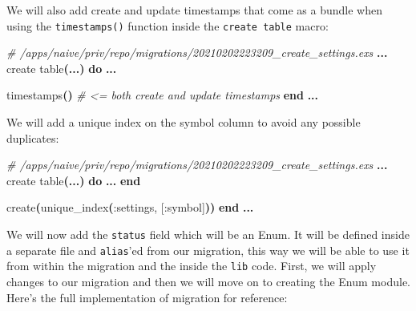 \documentclass[
  oneside]{book}
\newenvironment{Shaded}{\begin{snugshade}}{\end{snugshade}}
\newcommand{\CommentTok}[1]{\textcolor[rgb]{0.56,0.35,0.01}{\textit{#1}}}
\newcommand{\FunctionTok}[1]{\textcolor[rgb]{0.13,0.29,0.53}{\textbf{#1}}}
\newcommand{\KeywordTok}[1]{\textcolor[rgb]{0.13,0.29,0.53}{\textbf{#1}}}
\newcommand{\NormalTok}[1]{#1}
\newcommand{\OperatorTok}[1]{\textcolor[rgb]{0.81,0.36,0.00}{\textbf{#1}}}
\newcommand{\OtherTok}[1]{\textcolor[rgb]{0.56,0.35,0.01}{#1}}
\newcommand{\VariableTok}[1]{\textcolor[rgb]{0.00,0.00,0.00}{#1}}
\begin{document}
\newpage

We will also add create and update timestamps that come as a bundle when using the \texttt{timestamps()} function inside the \texttt{create\ table} macro:

\begin{Shaded}
\begin{Highlighting}[]
\CommentTok{\# /apps/naive/priv/repo/migrations/20210202223209\_create\_settings.exs}
\OperatorTok{...}
\NormalTok{    create table}\FunctionTok{(}\OperatorTok{...}\FunctionTok{)} \KeywordTok{do}
      \OperatorTok{...}

\NormalTok{      timestamps}\FunctionTok{()} \CommentTok{\# \textless{}= both create and update timestamps}
    \KeywordTok{end}
    \OperatorTok{...}
\end{Highlighting}
\end{Shaded}

We will add a unique index on the symbol column to avoid any possible duplicates:

\begin{Shaded}
\begin{Highlighting}[]
\CommentTok{\# /apps/naive/priv/repo/migrations/20210202223209\_create\_settings.exs}
\OperatorTok{...}
\NormalTok{    create table}\FunctionTok{(}\OperatorTok{...}\FunctionTok{)} \KeywordTok{do}
      \OperatorTok{...}
    \KeywordTok{end}

\NormalTok{    create}\FunctionTok{(}\NormalTok{unique\_index}\FunctionTok{(}\VariableTok{:settings}\NormalTok{, }\OtherTok{[}\VariableTok{:symbol}\OtherTok{]}\FunctionTok{))}
  \KeywordTok{end}
\OperatorTok{...}
\end{Highlighting}
\end{Shaded}

We will now add the \texttt{status} field which will be an Enum. It will be defined inside a separate file and \texttt{alias}'ed from our migration, this way we will be able to use it from within the migration and the inside the \texttt{lib} code. First, we will apply changes to our migration and then we will move on to creating the Enum module.
Here's the full implementation of migration for reference:
\end{document}
